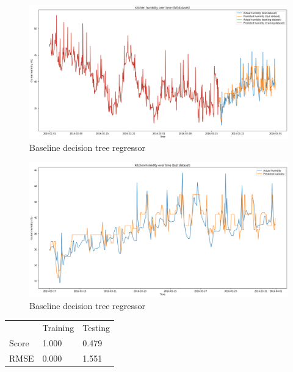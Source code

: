 \documentclass[9.5pt]{beamer}
\begin{document}
    \begin{frame}{}
        \bigskip
        \begin{figure}
            \centering
            \includegraphics[width=\linewidth]{images/full}
            \caption{Baseline decision tree regressor}
        \end{figure}
    \end{frame}
    \begin{frame}{}
        \bigskip
        \begin{figure}
            \centering
            \includegraphics[width=\linewidth]{images/baseline_tree}
            \caption{Baseline decision tree regressor}
        \end{figure}
        \small
        \begin{table}
            \begin{tabular}{l l l}
                & Training & Testing \\
                Score & 1.000    & 0.479   \\
                RMSE  & 0.000    & 1.551
            \end{tabular}
        \end{table}
    \end{frame}
\end{document}
